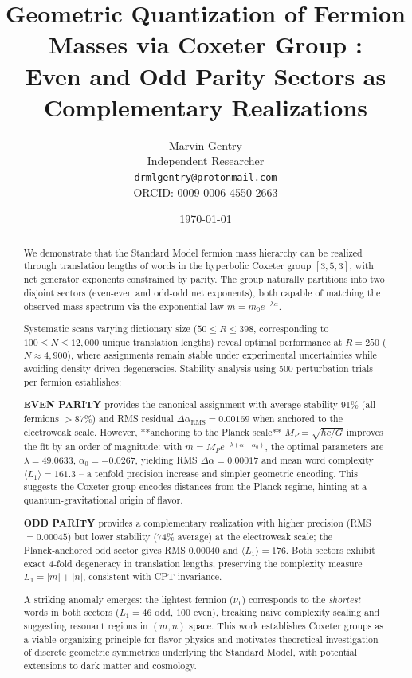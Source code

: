 \documentclass[11pt,a4paper]{article}
\title{\textbf{Geometric Quantization of Fermion Masses via Coxeter Group \tgrp: \\ 
Even and Odd Parity Sectors as Complementary Realizations}}
\author{Marvin Gentry \\
\small Independent Researcher \\
\small \texttt{drmlgentry@protonmail.com} \\
\small ORCID: 0009-0006-4550-2663}
\date{\today}
\newcommand{\tgrp}{\ensuremath{[3,5,3]}}
\begin{document}
\maketitle

\begin{abstract}
We demonstrate that the Standard Model fermion mass hierarchy can be realized through translation lengths of words in the hyperbolic Coxeter group \tgrp, with net generator exponents constrained by parity. The group naturally partitions into two disjoint sectors (even-even and odd-odd net exponents), both capable of matching the observed mass spectrum via the exponential law $m = m_0 e^{-\lambda \alpha}$. 

Systematic scans varying dictionary size ($50 \le R \le 398$, corresponding to $100 \le N \le 12{,}000$ unique translation lengths) reveal optimal performance at $R=250$ ($N \approx 4{,}900$), where assignments remain stable under experimental uncertainties while avoiding density-driven degeneracies. Stability analysis using 500 perturbation trials per fermion establishes:

\textbf{EVEN PARITY} provides the canonical assignment with average stability 91\% (all fermions $>87\%$) and RMS residual $\Delta\alpha_{\text{RMS}} = 0.00169$ when anchored to the electroweak scale. However, **anchoring to the Planck scale** $M_P = \sqrt{\hbar c/G}$ improves the fit by an order of magnitude: with $m = M_P e^{-\lambda(\alpha-\alpha_0)}$, the optimal parameters are $\lambda = 49.0633$, $\alpha_0 = -0.0267$, yielding RMS $\Delta\alpha = 0.00017$ and mean word complexity $\langle L_1 \rangle = 161.3$ – a tenfold precision increase and simpler geometric encoding. This suggests the Coxeter group encodes distances from the Planck regime, hinting at a quantum‑gravitational origin of flavor.

\textbf{ODD PARITY} provides a complementary realization with higher precision (RMS $= 0.00045$) but lower stability (74\% average) at the electroweak scale; the Planck‑anchored odd sector gives RMS $0.00040$ and $\langle L_1 \rangle = 176$. Both sectors exhibit exact 4‑fold degeneracy in translation lengths, preserving the complexity measure $L_1 = |m| + |n|$, consistent with CPT invariance.

A striking anomaly emerges: the lightest fermion ($\nu_1$) corresponds to the \emph{shortest} words in both sectors ($L_1 = 46$ odd, $100$ even), breaking naive complexity scaling and suggesting resonant regions in $(m,n)$ space. This work establishes Coxeter groups as a viable organizing principle for flavor physics and motivates theoretical investigation of discrete geometric symmetries underlying the Standard Model, with potential extensions to dark matter and cosmology.
\end{abstract}
\end{document}
